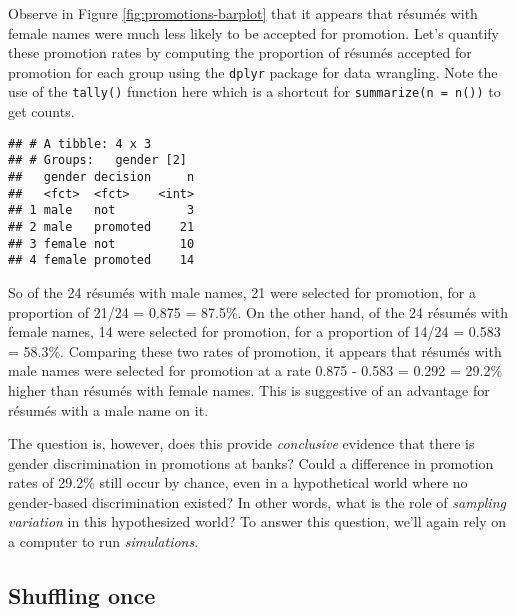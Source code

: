 \documentclass[
]{book}
\newenvironment{Shaded}{\begin{snugshade}}{\end{snugshade}}
\newcommand{\KeywordTok}[1]{\textcolor[rgb]{0.13,0.29,0.53}{\textbf{#1}}}
\newcommand{\NormalTok}[1]{#1}
\newcommand{\OperatorTok}[1]{\textcolor[rgb]{0.81,0.36,0.00}{\textbf{#1}}}
\newcommand{\StringTok}[1]{\textcolor[rgb]{0.31,0.60,0.02}{#1}}
\begin{document}
Observe in Figure \ref{fig:promotions-barplot} that it appears that résumés with female names were much less likely to be accepted for promotion. Let's quantify these promotion rates by computing the proportion of résumés accepted for promotion for each group using the \texttt{dplyr} package for data wrangling. Note the use of the \texttt{tally()} function here which is a shortcut for \texttt{summarize(n\ =\ n())} to get counts.

\begin{Shaded}
\end{Shaded}

\begin{verbatim}
## # A tibble: 4 x 3
## # Groups:   gender [2]
##   gender decision     n
##   <fct>  <fct>    <int>
## 1 male   not          3
## 2 male   promoted    21
## 3 female not         10
## 4 female promoted    14
\end{verbatim}

So of the 24 résumés with male names, 21 were selected for promotion, for a proportion of 21/24 = 0.875 = 87.5\%. On the other hand, of the 24 résumés with female names, 14 were selected for promotion, for a proportion of 14/24 = 0.583 = 58.3\%. Comparing these two rates of promotion, it appears that résumés with male names were selected for promotion at a rate 0.875 - 0.583 = 0.292 = 29.2\% higher than résumés with female names. This is suggestive of an advantage for résumés with a male name on it.

The question is, however, does this provide \emph{conclusive} evidence that there is gender discrimination in promotions at banks? Could a difference in promotion rates of 29.2\% still occur by chance, even in a hypothetical world where no gender-based discrimination existed? In other words, what is the role of \emph{sampling variation} in this hypothesized world? To answer this question, we'll again rely on a computer to run \emph{simulations}.

\hypertarget{shuffling-once}{%
\subsection{Shuffling once}\label{shuffling-once}}
\end{document}
